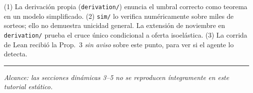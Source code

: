 \documentclass[11pt,a4paper]{article}
\theoremstyle{definition}
\theoremstyle{plain}
\theoremstyle{remark}
\numberwithin{equation}{section}
\begin{document}
\begin{nota}
(1) La derivación propia (\texttt{derivation/}) enuncia el umbral correcto como teorema en un modelo simplificado.
(2) \texttt{sim/} lo verifica numéricamente sobre miles de sorteos; ello no demuestra unicidad general. La extensión de noviembre en \texttt{derivation/} prueba el cruce único condicional a oferta isoelástica.
(3) La corrida de Lean recibió la Prop.~3 \emph{sin aviso} sobre este punto, para ver si el agente lo detecta.
\end{nota}

\vspace{1em}
\hrule
\vspace{0.5em}
\noindent\emph{Alcance: las secciones dinámicas 3--5 no se reproducen íntegramente en este tutorial estático.}
\end{document}
